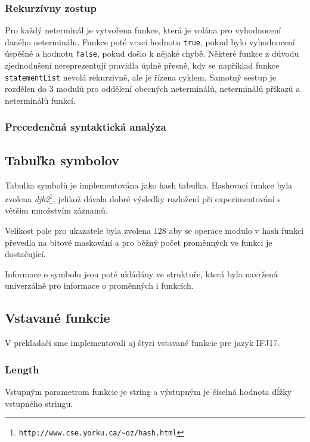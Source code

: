 \documentclass{article}
\begin{document}
            \subsubsection{Rekurzívny zostup}
                Pro každý neterminál je vytvořena funkce, která je volána pro vyhodnocení daného neterminálu.
                Funkce poté vrací hodnotu \texttt{true}, pokud bylo vyhodnocení úspěšné a hodnotu \texttt{false}, pokud došlo k nějaké chybě. Některé funkce z důvodu zjednodušení nereprezentují pravidla úplně přesně, kdy se například funkce \texttt{statementList} nevolá rekurzivně, ale je řízena cyklem. Samotný sestup je rozdělen do 3 modulů pro oddělení obecných neterminálů, neterminálů příkazů a neterminálů funkcí.
            
            \subsubsection{Precedenčná syntaktická analýza}
    
        \subsection{Tabuľka symbolov}
            Tabulka symbolů je implementována jako hash tabulka. Hashovací funkce byla zvolena \emph{djb2}\footnote{\texttt{http://www.cse.yorku.ca/\~{}oz/hash.html}}, jelikož dávala dobré výsledky rozložení při experimentování s větším množstvím záznamů.
            
            Velikost pole pro ukazatele byla zvolena $128$ aby se operace modulo v hash funkci převedla na bitové maskování a pro běžný počet proměnných ve funkci je dostačující.
            
            Informace o symbolu jsou poté ukládány ve struktuře, která byla navržená univerzálně pro informace o proměnných i funkcích.
        
        \subsection{Vstavané funkcie}
            V prekladači sme implementovali aj štyri vstavané funkcie pre jazyk IFJ17.
            
            \subsubsection{Length}
            Vstupným parametrom funkcie je string a výstupným je číselná hodnota dĺžky vstupného stringu.
            
\end{document}
